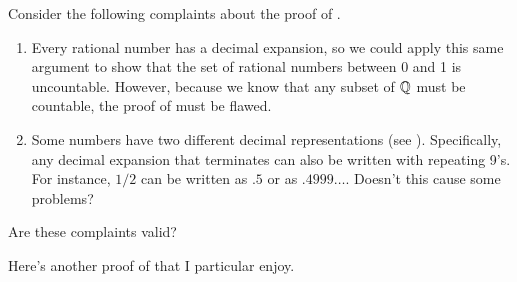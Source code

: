 \documentclass[11pt,twoside=off,numbers=noenddot]{scrbook}
\begin{document}
\begin{remark}
  Consider the following complaints about the proof of
  .

  \begin{enumerate}
    \item Every rational number has a decimal expansion, so we could
      apply this same argument to show that the set of rational
      numbers between 0 and 1 is uncountable. However, because we
      know that any subset of $\mathbb Q$ must be countable, the proof of
       must be flawed.
    \item Some numbers have two different decimal representations
      (see ). Specifically, any decimal expansion
      that terminates can also be written with repeating 9's. For
      instance, $1/2$ can be written as $.5$ or as $.4999\dots$.
      Doesn't this cause some problems?
  \end{enumerate}

  Are these complaints valid?
\end{remark}

Here's another proof of 
that I particular enjoy.
\end{document}
